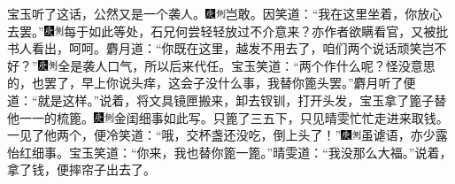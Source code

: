 宝玉听了这话，公然又是一个袭人。{\includegraphics[width=3mm]{../Images/00004}\includegraphics[width=3mm]{../Images/00011}\footnotesize \kaishu 岂敢。}因笑道：``我在这里坐着，你放心去罢。''{\includegraphics[width=3mm]{../Images/00004}\includegraphics[width=3mm]{../Images/00011}\footnotesize \kaishu 每于如此等处，石兄何尝轻轻放过不介意来？亦作者欲瞒看官，又被批书人看出，呵呵。}麝月道：``你既在这里，越发不用去了，咱们两个说话顽笑岂不好？''{\includegraphics[width=3mm]{../Images/00004}\includegraphics[width=3mm]{../Images/00011}\footnotesize \kaishu 全是袭人口气，所以后来代任。}宝玉笑道：``两个作什么呢？怪没意思的，也罢了，早上你说头痒，这会子没什么事，我替你篦头罢。''麝月听了便道：``就是这样。''说着，将文具镜匣搬来，卸去钗钏，打开头发，宝玉拿了篦子替他一一的梳篦。{\includegraphics[width=3mm]{../Images/00004}\includegraphics[width=3mm]{../Images/00011}\footnotesize \kaishu 金闺细事如此写。}只篦了三五下，只见晴雯忙忙走进来取钱。一见了他两个，便冷笑道：``哦，交杯盏还没吃，倒上头了！''{\includegraphics[width=3mm]{../Images/00004}\includegraphics[width=3mm]{../Images/00011}\footnotesize \kaishu 虽谑语，亦少露怡红细事。}宝玉笑道：``你来，我也替你篦一篦。''晴雯道：``我没那么大福。''说着，拿了钱，便摔帘子出去了。

